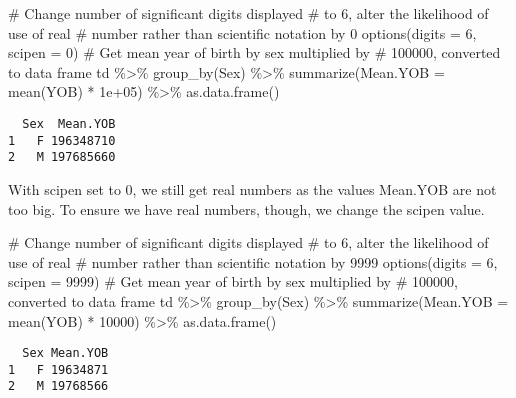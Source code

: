 \documentclass[
  12pt,
  letterpaper]{article}
\newenvironment{Shaded}{\begin{snugshade}}{\end{snugshade}}
\newcommand{\AttributeTok}[1]{\textcolor[rgb]{0.40,0.45,0.13}{#1}}
\newcommand{\CommentTok}[1]{\textcolor[rgb]{0.37,0.37,0.37}{#1}}
\newcommand{\DecValTok}[1]{\textcolor[rgb]{0.68,0.00,0.00}{#1}}
\newcommand{\FloatTok}[1]{\textcolor[rgb]{0.68,0.00,0.00}{#1}}
\newcommand{\FunctionTok}[1]{\textcolor[rgb]{0.28,0.35,0.67}{#1}}
\newcommand{\NormalTok}[1]{\textcolor[rgb]{0.00,0.23,0.31}{#1}}
\newcommand{\SpecialCharTok}[1]{\textcolor[rgb]{0.37,0.37,0.37}{#1}}
\renewcommand\texttt[1]{{\ttfamily\color{BrickRed}#1}}
\begin{document}
\begin{Shaded}
\begin{Highlighting}[]
\CommentTok{\# Change number of significant digits displayed}
\CommentTok{\# to 6, alter the likelihood of use of real}
\CommentTok{\# number rather than scientific notation by 0}
\FunctionTok{options}\NormalTok{(}\AttributeTok{digits =} \DecValTok{6}\NormalTok{, }\AttributeTok{scipen =} \DecValTok{0}\NormalTok{)}
\CommentTok{\# Get mean year of birth by sex multiplied by}
\CommentTok{\# 100000, converted to data frame}
\NormalTok{td }\SpecialCharTok{\%\textgreater{}\%}
    \FunctionTok{group\_by}\NormalTok{(Sex) }\SpecialCharTok{\%\textgreater{}\%}
    \FunctionTok{summarize}\NormalTok{(}\AttributeTok{Mean.YOB =} \FunctionTok{mean}\NormalTok{(YOB) }\SpecialCharTok{*} \FloatTok{1e+05}\NormalTok{) }\SpecialCharTok{\%\textgreater{}\%}
    \FunctionTok{as.data.frame}\NormalTok{()}
\end{Highlighting}
\end{Shaded}

\begin{verbatim}
  Sex  Mean.YOB
1   F 196348710
2   M 197685660
\end{verbatim}

With \texttt{scipen} set to 0, we still get real numbers as the values
\texttt{Mean.YOB} are not too big. To ensure we have real numbers,
though, we change the \texttt{scipen} value.

\begin{Shaded}
\begin{Highlighting}[]
\CommentTok{\# Change number of significant digits displayed}
\CommentTok{\# to 6, alter the likelihood of use of real}
\CommentTok{\# number rather than scientific notation by 9999}
\FunctionTok{options}\NormalTok{(}\AttributeTok{digits =} \DecValTok{6}\NormalTok{, }\AttributeTok{scipen =} \DecValTok{9999}\NormalTok{)}
\CommentTok{\# Get mean year of birth by sex multiplied by}
\CommentTok{\# 100000, converted to data frame}
\NormalTok{td }\SpecialCharTok{\%\textgreater{}\%}
    \FunctionTok{group\_by}\NormalTok{(Sex) }\SpecialCharTok{\%\textgreater{}\%}
    \FunctionTok{summarize}\NormalTok{(}\AttributeTok{Mean.YOB =} \FunctionTok{mean}\NormalTok{(YOB) }\SpecialCharTok{*} \DecValTok{10000}\NormalTok{) }\SpecialCharTok{\%\textgreater{}\%}
    \FunctionTok{as.data.frame}\NormalTok{()}
\end{Highlighting}
\end{Shaded}

\begin{verbatim}
  Sex Mean.YOB
1   F 19634871
2   M 19768566
\end{verbatim}
\end{document}
